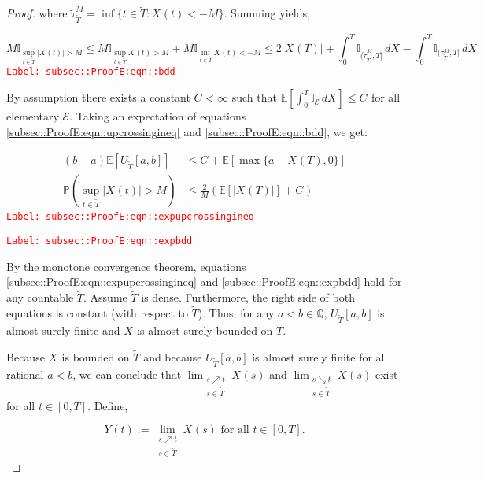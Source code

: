 \documentclass[12pt]{article}
\newcommand{\mb}{\mathbb}
\newcommand{\mc}{\mathcal}
\newcommand{\te}{\text}
\newcommand{\tr}{\textcolor{red}}
\newcommand{\labe}[1]{\tr{\texttt{Label: #1}}}
\newcommand{\ind}{\hspace{24pt}}
\newcommand{\pr}{\mb{P}}							%
\newcommand{\ex}[1]{\mb{E}\left[#1\right]}			%
\newcommand{\T}{T}								%
\renewcommand{\t}{t}							%
\renewcommand{\tt}{s}							%
\newcommand{\X}{X}								%
\newcommand{\cind}[1]{_{#1}}					%
\newcommand{\tp}[1]{(#1)}						%
\newcommand{\tip}[1]{#1}						%
\newcommand{\const}{C}							%
\newcommand{\alt}[1]{\widetilde{#1}}			%
\newcommand{\indx}[1]{_{#1}}					%
\newcommand{\XX}{Y}								%
\newcommand{\rt}{\tau}							%
\newcommand{\evnt}{\mc{E}}						%
\newcommand{\Tset}{\alt{T}}						%
\newcommand{\upcrs}{U}							%
\newcommand{\gid}[1]{^{#1}}						%
\newcommand{\gidd}[1]{_{#1}}					%
\begin{document}
\begin{proof}
where \(\alt{\rt}\gid{M}\gidd{\Tset} = \inf\{\t\in \Tset: \X\cind{}\tp{\t} < -M\}\). Summing yields,

\begin{equation}
M\mb{I}_{\sup_{\t\in\Tset}|\X\cind{}\tp{\t}| > M} \leq M\mb{I}_{\sup_{\t\in\Tset}\X\cind{}\tp{\t} > M} + M\mb{I}_{\inf_{\t\in\Tset}\X\cind{}\tp{\t} < -M} \leq 2|\X\cind{}\tp{\T}| + \int_0^\T \mb{I}_{(\alt{\rt}\gid{M}\gidd{\Tset},\T]}\,d\X\cind{}\tip{} - \int_0^\T \mb{I}_{(\rt\gid{M}\gidd{\Tset},\T]}\,d\X\cind{}\tip{}
\label{subsec::ProofE:eqn::bdd}
\end{equation}
\labe{subsec::ProofE:eqn::bdd}

By assumption there exists a constant \(\const\indx{} < \infty\) such that \(\ex{\int_0^\T \mb{I}_{\evnt}\,d\X\cind{}\tip{}} \leq \const\indx{}\) for all elementary \(\evnt\). Taking an expectation of equations \eqref{subsec::ProofE:eqn::upcrossingineq} and \eqref{subsec::ProofE:eqn::bdd}, we get:

\begin{align}
(b-a)\ex{\upcrs\gidd{\Tset}[a,b]} &\leq \const\indx{} + \ex{\max\{a-\X\cind{}\tp{\T},0\}}
\label{subsec::ProofE:eqn::expupcrossingineq}\\
\pr\left(\sup_{\t\in\Tset} |\X\cind{}\tp{\t}| > M\right) &\leq \frac{2}{M}\left(\ex{|\X\cind{}\tp{\T}|} + \const\indx{}\right)
\label{subsec::ProofE:eqn::expbdd}
\end{align}
\labe{subsec::ProofE:eqn::expupcrossingineq}

\labe{subsec::ProofE:eqn::expbdd}

By the monotone convergence theorem, equations \eqref{subsec::ProofE:eqn::expupcrossingineq} and \eqref{subsec::ProofE:eqn::expbdd} hold for any countable \(\Tset\). Assume \(\Tset\) is dense. Furthermore, the right side of both equations is constant (with respect to \(\Tset\)). Thus, for any \(a < b \in \mb{Q}\), \(\upcrs\gidd{\Tset}[a,b]\) is almost surely finite and \(\X\cind{}\tip{}\) is almost surely bounded on \(\Tset\).

\ind Because \(\X\cind{}\tip{}\) is bounded on \(\Tset\) and because \(\upcrs\gidd{\Tset}[a,b]\) is almost surely finite for all rational \(a < b\), we can conclude that \(\lim_{\substack{\tt \nearrow \t\\ \tt \in \Tset}} \X\cind{}\tp{\tt}\) and \(\lim_{\substack{\tt \searrow \t\\ \tt \in \Tset}} \X\cind{}\tp{\tt}\) exist for all \(\t \in [0,\T]\). Define,

\[\XX\cind{}\tp{\t} := \lim_{\substack{\tt \nearrow \t\\\tt \in \Tset}} \X\cind{}\tp{\tt}\te{ for all } \t \in [0,\T].\]


\end{proof}
\end{document}
